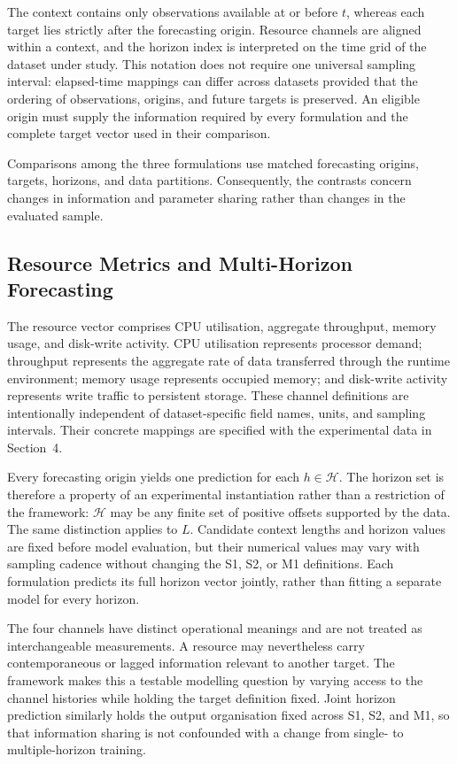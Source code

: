 \documentclass[a4paper,fleqn]{cas-dc}
\begin{document}
The context contains only observations available at or before $t$, whereas
each target lies strictly after the forecasting origin. Resource channels are
aligned within a context, and the horizon index is interpreted on the time
grid of the dataset under study. This notation does not require one universal
sampling interval: elapsed-time mappings can differ across datasets provided
that the ordering of observations, origins, and future targets is preserved.
An eligible origin must supply the information required by every formulation
and the complete target vector used in their comparison.

Comparisons among the three formulations use matched forecasting origins,
targets, horizons, and data
partitions. Consequently, the contrasts concern changes in information and
parameter sharing rather than changes in the evaluated sample.

\subsection{Resource Metrics and Multi-Horizon Forecasting}
\label{sec:resource-horizons}

The resource vector comprises CPU utilisation, aggregate throughput, memory
usage, and disk-write activity. CPU utilisation represents processor demand;
throughput represents the aggregate rate of data transferred through the
runtime environment; memory usage represents occupied memory; and disk-write
activity represents write traffic to persistent storage. These channel
definitions are intentionally independent of dataset-specific field names,
units, and sampling intervals. Their concrete mappings are specified with the
experimental data in Section~4.

Every forecasting origin yields one prediction for each
$h\in\mathcal{H}$. The horizon set is therefore a property of an experimental
instantiation rather than a restriction of the framework: $\mathcal{H}$ may be
any finite set of positive offsets supported by the data. The same distinction
applies to $L$. Candidate context lengths and horizon values are fixed before
model evaluation, but their numerical values may vary with sampling cadence
without changing the S1, S2, or M1 definitions. Each formulation predicts its
full horizon vector jointly, rather than fitting a separate model for every
horizon.

The four channels have distinct operational meanings and are not treated as
interchangeable measurements. A resource may nevertheless carry
contemporaneous or lagged information relevant to another target. The
framework makes this a testable modelling question by varying access to the
channel histories while holding the target definition fixed. Joint horizon
prediction similarly holds the output organisation fixed across S1, S2, and
M1, so that information sharing is not confounded with a change from single-
to multiple-horizon training.
\end{document}

